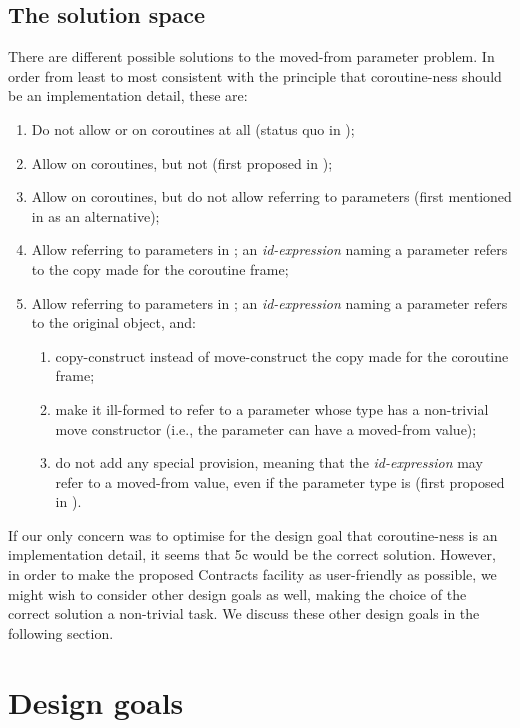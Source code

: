 \subsection{The solution space}
\label{solutions}

There are different possible solutions to the moved-from parameter problem. In order from least to most consistent with the principle that coroutine-ness should be an implementation detail, these are:
\begin{enumerate}
\item Do not allow  or  on coroutines at all (status quo in \cite{P2900R8});
\item Allow  on coroutines, but not  (first proposed in \cite{P2957R1});
\item Allow  on coroutines, but do not allow referring to parameters (first mentioned in \cite{P2957R1} as an alternative);
\item Allow referring to parameters in ; an \emph{id-expression} naming a parameter refers to the copy made for the coroutine frame;
\item Allow referring to parameters in ; an \emph{id-expression} naming a parameter refers to the original object, and:
\begin{enumerate}[label=\alph*.,ref=\theenumi\alph*]
        \item copy-construct instead of move-construct the copy made for the coroutine frame;
        \item make it ill-formed to refer to a parameter whose type has a non-trivial move constructor (i.e., the parameter can have a moved-from value);
        \item do not add any special provision, meaning that the \emph{id-expression} may refer to a moved-from value, even if the parameter type is  (first proposed in \cite{P2957R0}).
\end{enumerate}
\end{enumerate}

If our only concern was to optimise for the design goal that coroutine-ness is an implementation detail, it seems that 5c would be the correct solution. However, in order to make the proposed Contracts facility as user-friendly as possible, we might wish to consider other design goals as well, making the choice of the correct solution a non-trivial task. We discuss these other design goals in the following section.

\section{Design goals}

